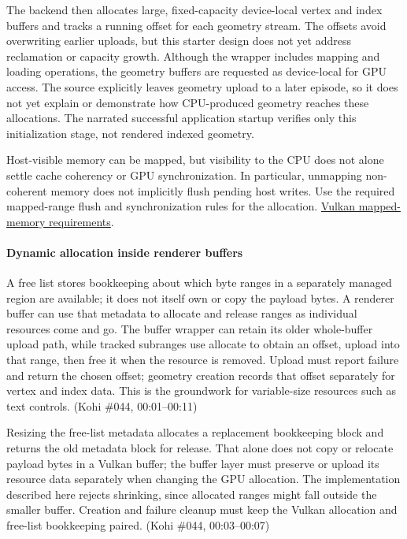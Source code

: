 The backend then allocates large, fixed-capacity device-local vertex and index buffers and tracks a running offset for each geometry stream. The offsets avoid overwriting earlier uploads, but this starter design does not yet address reclamation or capacity growth. Although the wrapper includes mapping and loading operations, the geometry buffers are requested as device-local for GPU access. The source explicitly leaves geometry upload to a later episode, so it does not yet explain or demonstrate how CPU-produced geometry reaches these allocations. The narrated successful application startup verifies only this initialization stage, not rendered indexed geometry.

Host-visible memory can be mapped, but visibility to the CPU does not alone settle cache coherency or GPU synchronization. In particular, unmapping non-coherent memory does not implicitly flush pending host writes. Use the required mapped-range flush and synchronization rules for the allocation. \href{https://docs.vulkan.org/refpages/latest/refpages/source/vkFlushMappedMemoryRanges.html}{Vulkan mapped-memory requirements}.

\paragraph{Dynamic allocation inside renderer buffers}\label{dynamic-allocation-inside-renderer-buffers}

A free list stores bookkeeping about which byte ranges in a separately managed region are available; it does not itself own or copy the payload bytes. A renderer buffer can use that metadata to allocate and release ranges as individual resources come and go. The buffer wrapper can retain its older whole-buffer upload path, while tracked subranges use allocate to obtain an offset, upload into that range, then free it when the resource is removed. Upload must report failure and return the chosen offset; geometry creation records that offset separately for vertex and index data. This is the groundwork for variable-size resources such as text controls. (Kohi \#044, 00:01--00:11)

Resizing the free-list metadata allocates a replacement bookkeeping block and returns the old metadata block for release. That alone does not copy or relocate payload bytes in a Vulkan buffer; the buffer layer must preserve or upload its resource data separately when changing the GPU allocation. The implementation described here rejects shrinking, since allocated ranges might fall outside the smaller buffer. Creation and failure cleanup must keep the Vulkan allocation and free-list bookkeeping paired. (Kohi \#044, 00:03--00:07)

